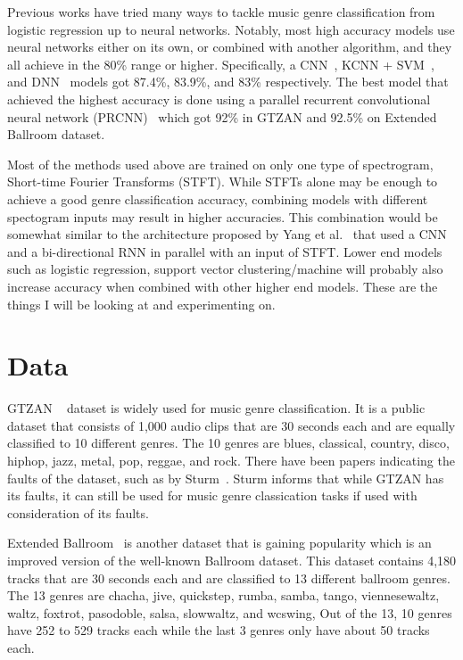 \documentclass[10pt,twocolumn,letterpaper]{article}
\begin{document}
	Previous works have tried many ways to tackle music genre classification from logistic regression up to neural networks. Notably, most high accuracy models use neural networks either on its own, or combined with another algorithm, and they all achieve in the 80\% range or higher. Specifically, a CNN~\cite{zhang2016improved}, KCNN + SVM~\cite{zhang2015deep}, and DNN~\cite{sigtia2014improved} models got 87.4\%, 83.9\%, and 83\% respectively. The best model that achieved the highest accuracy is done using a parallel recurrent convolutional neural network (PRCNN)~\cite{yang2020parallel} which got 92\% in GTZAN and 92.5\% on Extended Ballroom dataset.
	
	Most of the methods used above are trained on only one type of spectrogram, Short-time Fourier Transforms (STFT). While STFTs alone may be enough to achieve a good genre classification accuracy, combining models with different spectogram inputs may result in higher accuracies. This combination would be somewhat similar to the architecture proposed by Yang et al.~\cite{yang2020parallel} that used a CNN and a bi-directional RNN in parallel with an input of STFT. Lower end models such as logistic regression, support vector clustering/machine will probably also increase accuracy when combined with other higher end models. These are the things I will be looking at and experimenting on.
	
	\section{Data}
	
	GTZAN ~\cite{tzanetakis2002musical} dataset is widely used for music genre classification. It is a public dataset that consists of 1,000 audio clips that are 30 seconds each and are equally classified to 10 different genres. The 10 genres are blues, classical, country, disco, hiphop, jazz, metal, pop, reggae, and rock. There have been papers indicating the faults of the dataset, such as by Sturm~\cite{sturm2013gtzan}. Sturm informs that while GTZAN has its faults, it can still be used for music genre classication tasks if used with consideration of its faults.
	
	Extended Ballroom~\cite{marchand2016extended} is another dataset that is gaining popularity which is an improved version of the well-known Ballroom dataset. This dataset contains 4,180 tracks that are 30 seconds each and are classified to 13 different ballroom genres. The 13 genres are chacha, jive, quickstep, rumba, samba, tango, viennesewaltz, waltz, foxtrot, pasodoble, salsa, slowwaltz, and wcswing, Out of the 13, 10 genres have 252 to 529 tracks each while the last 3 genres only have about 50 tracks each.
	
\end{document}
